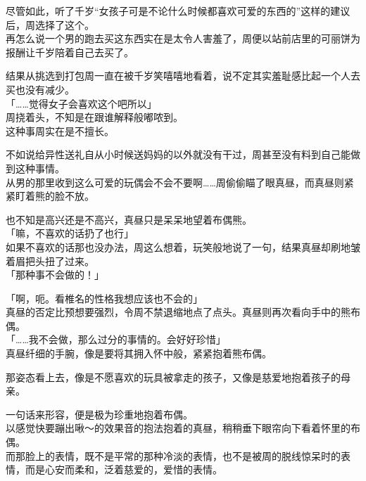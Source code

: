 尽管如此，听了千岁“女孩子可是不论什么时候都喜欢可爱的东西的”这样的建议后，周选择了这个。\\

再怎么说一个男的跑去买这东西实在是太令人害羞了，周便以站前店里的可丽饼为报酬让千岁陪着自己去买了。

结果从挑选到打包周一直在被千岁笑嘻嘻地看着，说不定其实羞耻感比起一个人去买也没有减少。\\

「……觉得女子会喜欢这个吧所以」\\

周挠着头，不知是在跟谁解释般嘟哝到。\\

这种事周实在是不擅长。

不如说给异性送礼自从小时候送妈妈的以外就没有干过，周甚至没有料到自己能做到这种事情。\\

从男的那里收到这么可爱的玩偶会不会不要啊……周偷偷瞄了眼真昼，而真昼则紧紧盯着熊的脸不放。

也不知是高兴还是不高兴，真昼只是呆呆地望着布偶熊。\\

「嘛，不喜欢的话扔了也行」\\

如果不喜欢的话那也没办法，周这么想着，玩笑般地说了一句，结果真昼却刷地皱着眉把头扭了过来。\\

「那种事不会做的！」

「啊，呃。看椎名的性格我想应该也不会的」\\

真昼的否定比预想要强烈，令周不禁退缩地点了点头。真昼则再次看向手中的熊布偶。\\

「……我不会做，那么过分的事情的。会好好珍惜」\\

真昼纤细的手腕，像是要将其拥入怀中般，紧紧抱着熊布偶。

那姿态看上去，像是不愿喜欢的玩具被拿走的孩子，又像是慈爱地抱着孩子的母亲。

一句话来形容，便是极为珍重地抱着布偶。\\

以感觉快要蹦出啾～的效果音的抱法抱着的真昼，稍稍垂下眼帘向下看着怀里的布偶。\\

而那脸上的表情，既不是平常的那种冷淡的表情，也不是被周的脱线惊呆时的表情，而是心安而柔和，泛着慈爱的，爱惜的表情。

